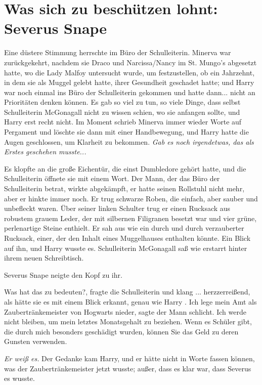 \chapter{Was sich zu beschützen lohnt: Severus Snape}

Eine düstere Stimmung herrschte im Büro der Schulleiterin. Minerva war
zurückgekehrt, nachdem sie Draco und Narcissa/Nancy im St. Mungo's abgesetzt
hatte, wo die Lady Malfoy untersucht wurde, um festzustellen, ob ein Jahrzehnt,
in dem sie als Muggel gelebt hatte, ihrer Gesundheit geschadet hatte; und Harry
war noch einmal ins Büro der Schulleiterin gekommen und hatte dann... nicht an
Prioritäten denken können. Es gab so viel zu tun, so viele Dinge, dass selbst
Schulleiterin McGonagall nicht zu wissen schien, wo sie anfangen sollte, und
Harry erst recht nicht. Im Moment schrieb Minerva immer wieder Worte auf
Pergament und löschte sie dann mit einer Handbewegung, und Harry hatte die Augen
geschlossen, um Klarheit zu bekommen. \emph{ Gab es noch irgendetwas, das als
Erstes geschehen musste...}

Es klopfte an die große Eichentür, die einst Dumbledore gehört hatte, und die
Schulleiterin öffnete sie mit einem Wort. Der Mann, der das Büro der
Schulleiterin betrat, wirkte abgekämpft, er hatte seinen Rollstuhl nicht mehr,
aber er hinkte immer noch. Er trug schwarze Roben, die einfach, aber sauber und
unbefleckt waren. Über seiner linken Schulter trug er einen Rucksack aus
robustem grauem Leder, der mit silbernen Filigranen besetzt war und vier grüne,
perlenartige Steine enthielt. Er sah aus wie ein durch und durch verzauberter
Rucksack, einer, der den Inhalt eines Muggelhauses enthalten könnte. Ein Blick
auf ihn, und Harry wusste es. Schulleiterin McGonagall saß wie erstarrt hinter
ihrem neuen Schreibtisch.

Severus Snape neigte den Kopf zu ihr.

\glqq{}Was hat das zu bedeuten?\grqq{}, fragte die Schulleiterin und klang ...
herzzerreißend, als hätte sie es mit einem Blick erkannt, genau wie Harry .
\glqq{}Ich lege mein Amt als Zaubertränkemeister von Hogwarts nieder\grqq{},
sagte der Mann schlicht. \glqq{}Ich werde nicht bleiben, um mein letztes
Monatsgehalt zu beziehen. Wenn es Schüler gibt, die durch mich besonders
geschädigt wurden, können Sie das Geld zu deren Gunsten verwenden.\grqq{}

\emph{Er weiß es.}
Der Gedanke kam Harry, und er hätte nicht in Worte fassen können, was der
Zaubertränkemeister jetzt wusste; außer, dass es klar war, dass Severus es
wusste.

